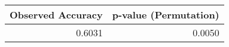 \begin{tabular}{rr}
\toprule
Observed Accuracy & p-value (Permutation) \\
\midrule
0.6031 & 0.0050 \\
\bottomrule
\end{tabular}
